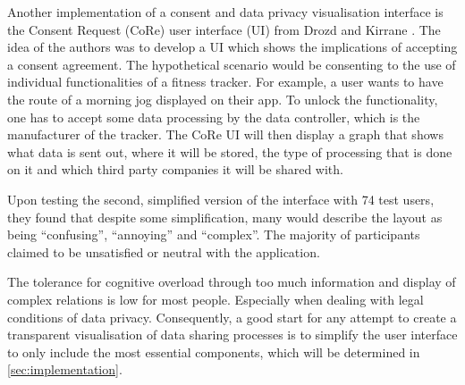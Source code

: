 \documentclass[../paper.tex]{subfiles}
\begin{document}
  Another implementation of a consent and data privacy visualisation interface
  is the Consent Request (CoRe) user interface (UI) from Drozd and Kirrane
  \cite{cure2020}.  The idea of the authors was to develop a
  UI which shows the implications of accepting a consent agreement. The
  hypothetical scenario would be consenting to the use of individual
  functionalities of a fitness tracker. For example, a user wants to have the
  route of a morning jog displayed on their app. To unlock the functionality, one
  has to accept some data processing by the data controller, which is the
  manufacturer of the tracker. The CoRe UI \cite{cure2020} will then display a
  graph that shows what data is sent out, where it will be stored, the type of
  processing that is done on it and which third party companies it will be
  shared with.

  Upon testing the second, simplified version of the interface with 74 test users, they 
  found that despite some simplification, many would describe the layout 
  as being “confusing”, “annoying” and “complex”. The majority of participants
  claimed to be unsatisfied or neutral with the application.
  
  The tolerance for cognitive overload through too much information and display 
  of complex relations is low for most people. Especially when dealing with 
  legal conditions of data privacy. Consequently, a good start for any attempt
  to create a transparent visualisation of data sharing processes is to simplify
  the user interface to only include the most essential components, which will
  be determined in \cref{sec:implementation}.
\end{document}
